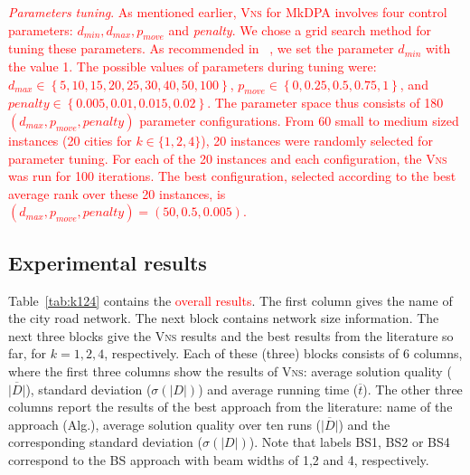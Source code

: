 \documentclass[dvipsnames,format=sigconf]{acmart} %
\begin{document}
   \textcolor{red}{\emph{Parameters tuning}. As mentioned earlier, \textsc{Vns} for MkDPA involves four control parameters: $d_{min}, d_{max}, p_{move}$ and \emph{penalty}. We chose a grid search method for tuning these parameters. As recommended in  ~\cite{mladenovic1997variable}, we set the parameter $d_{min}$ with the value 1. The possible values of parameters during tuning were:
  $d_{max}\in{\left\lbrace 5, 10, 15, 20, 25, 30, 40, 50, 100\right\rbrace }$,  $p_{move}\in{\left\lbrace 0, 0.25, 0.5, 0.75, 1\right\rbrace }$, and $penalty\in{\left\lbrace 0.005, 0.01, 0.015, 0.02\right\rbrace }$. The parameter space thus consists of 180 $(d_{max}, p_{move}, penalty)$ parameter configurations. From 60 small to medium sized instances (20 cities for $k \in \{1, 2, 4\}$), 20 instances were randomly selected for parameter tuning. For each of the 20 instances and each configuration, the \textsc{Vns} was run for 100 iterations. The best configuration, selected according to the best average rank over these 20 instances, is $(d_{max}, p_{move}, penalty )=(50,0.5, 0.005)$.}

\subsection{Experimental results }
{ \color{red} Table~\ref{tab:k124} contains the \textcolor{red}{overall results}. The first column gives the name of the city road network. The next block contains network size information. The next three blocks give the \textsc{Vns} results and the best results from the literature so far, for $k=1,2,4$, respectively. Each of these (three) blocks consists of 6 columns, where the first three columns show the results of \textsc{Vns}: average solution quality ($\overline{|D|}$), standard deviation ($\sigma(|D|)$) and average running time ($\overline{t}$). The other three columns report  the results of the best approach from the literature:  name of the approach (Alg.), average solution quality over ten runs ($\overline{|D|}$) and the corresponding standard deviation ($\sigma(|D|)$).  Note that labels BS1, BS2 or BS4 correspond to the BS approach with beam widths of 1,2 and 4, respectively. } 
\end{document}

